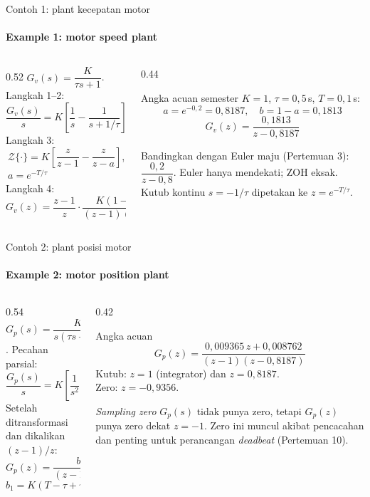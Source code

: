 \documentclass[aspectratio=169,10pt]{beamer}
\begin{document}
\begin{frame}{Contoh 1: plant kecepatan motor}
	\framesubtitle{Example 1: motor speed plant}
	\begin{columns}[T]
		\begin{column}{0.52\textwidth}
			\small
			$G_v(s) = \dfrac{K}{\tau s+1}$. Langkah 1--2:
			\[
				\frac{G_v(s)}{s} = K\left[\frac{1}{s} - \frac{1}{s+1/\tau}\right]
			\]
			Langkah 3: $\ \mathcal{Z}\{\cdot\} = K\left[\dfrac{z}{z-1} - \dfrac{z}{z-a}\right]$, $\ a = e^{-T/\tau}$\\[4pt]
			Langkah 4:
			\[
				G_v(z) = \frac{z-1}{z}\cdot\frac{K(1-a)z}{(z-1)(z-a)} = \frac{K(1-a)}{z-a}
			\]
		\end{column}
		\begin{column}{0.44\textwidth}
			\begin{block}{Angka acuan semester}
				\small
				$K=1$, $\tau=0{,}5$\,s, $T=0{,}1$\,s:
				\[
					a = e^{-0{,}2} = 0{,}8187,\quad b = 1-a = 0{,}1813
				\]
				\[
					G_v(z) = \frac{0{,}1813}{z - 0{,}8187}
				\]
			\end{block}
			\small Bandingkan dengan Euler maju (Pertemuan 3): $\dfrac{0{,}2}{z-0{,}8}$. Euler hanya mendekati; ZOH eksak.\\[3pt]
			Kutub kontinu $s=-1/\tau$ dipetakan ke $z = e^{-T/\tau}$.
		\end{column}
	\end{columns}
\end{frame}

\begin{frame}{Contoh 2: plant posisi motor}
	\framesubtitle{Example 2: motor position plant}
	\begin{columns}[T]
		\begin{column}{0.54\textwidth}
			\small
			$G_p(s) = \dfrac{K}{s(\tau s+1)}$. Pecahan parsial:
			\[
				\frac{G_p(s)}{s} = K\left[\frac{1}{s^2} - \frac{\tau}{s} + \frac{\tau}{s+1/\tau}\right]
			\]
			Setelah ditransformasi dan dikalikan $(z-1)/z$:
			\[
				G_p(z) = \frac{b_1z + b_0}{(z-1)(z-a)}
			\]
			\[
				b_1 = K(T - \tau + \tau a),\qquad b_0 = K(\tau - \tau a - aT)
			\]
		\end{column}
		\begin{column}{0.42\textwidth}
			\begin{block}{Angka acuan}
				\small
				\[
					G_p(z) = \frac{0{,}009365\,z + 0{,}008762}{(z-1)(z-0{,}8187)}
				\]
				Kutub: $z=1$ (integrator) dan $z=0{,}8187$.\\
				Zero: $z = -0{,}9356$.
			\end{block}
			\begin{alertblock}{\textit{Sampling zero}}
				\small
				$G_p(s)$ tidak punya zero, tetapi $G_p(z)$ punya zero dekat $z=-1$. Zero ini muncul akibat pencacahan dan penting untuk perancangan \textit{deadbeat} (Pertemuan 10).
			\end{alertblock}
		\end{column}
	\end{columns}
\end{frame}
\end{document}
